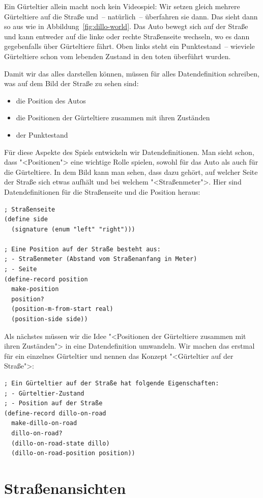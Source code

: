 Ein Gürteltier allein macht noch kein Videospiel: Wir setzen gleich
mehrere Gürteltiere auf die Straße und~-- natürlich~-- überfahren sie
dann.  Das sieht dann so aus wie in
Abbildung~\ref{fig:dillo-world}. Das Auto bewegt sich auf der Straße
und kann entweder auf die linke oder rechte Straßenseite wechseln, wo
es dann gegebenfalls über Gürteltiere fährt.  Oben links steht ein
Punktestand~-- wieviele Gürteltiere schon vom lebenden Zustand in den
toten überführt wurden.

Damit wir das alles darstellen können, müssen für alles
Datendefinition schreiben, was auf dem Bild der Straße zu sehen sind:
%
\begin{itemize}
\item die Position des Autos
\item die Positionen der Gürteltiere zusammen mit ihren Zuständen
\item der Punktestand
\end{itemize}
%
Für diese Aspekte des Spiels entwickeln wir Datendefinitionen.
Man sieht schon, dass "<Positionen"> eine wichtige Rolle spielen,
sowohl für das Auto als auch für die Gürteltiere.  In dem Bild kann
man sehen, dass dazu gehört, auf welcher Seite der Straße sich etwas
aufhält und bei welchem "<Straßenmeter">.  
Hier sind Datendefinitionen für die Straßenseite und die Position heraus:
%
\begin{lstlisting}
; Straßenseite
(define side
  (signature (enum "left" "right")))

; Eine Position auf der Straße besteht aus:
; - Straßenmeter (Abstand vom Straßenanfang in Meter)
; - Seite
(define-record position
  make-position
  position?
  (position-m-from-start real)
  (position-side side))
\end{lstlisting}
%
Als nächstes müssen wir die Idee "<Positionen der Gürteltiere zusammen
mit ihren Zuständen"> in eine Datendefinition umwandeln.  Wir machen
das erstmal für ein einzelnes Gürteltier und nennen das Konzept
"<Gürteltier auf der Straße">:
%
\begin{lstlisting}
; Ein Gürteltier auf der Straße hat folgende Eigenschaften:
; - Gürteltier-Zustand
; - Position auf der Straße
(define-record dillo-on-road
  make-dillo-on-road
  dillo-on-road?
  (dillo-on-road-state dillo)
  (dillo-on-road-position position))
\end{lstlisting}
%

\section{Straßenansichten}

